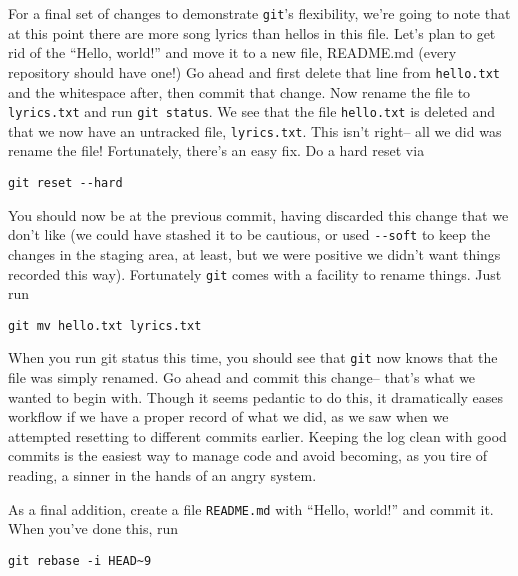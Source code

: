 {\par{
For a final set of changes to demonstrate \verb+git+'s flexibility, we're
going to note that at this point there are more song lyrics than hellos in
this file. Let's plan to get rid of the ``Hello, world!'' and move it to a new
file, README.md (every repository should have one!)
Go ahead and first delete that line from \verb+hello.txt+ and the whitespace
after, then commit that change. Now rename the file to \verb+lyrics.txt+ and
run \verb+git status+. We see that the file \verb+hello.txt+ is deleted and
that we now have an untracked file, \verb+lyrics.txt+. This isn't right-- all
we did was rename the file! Fortunately, there's an easy fix. Do a hard reset
via
}

\begin{verbatim}
git reset --hard
\end{verbatim}

\par{
You should now be at the previous commit, having discarded this change that we
don't like (we could have stashed it to be cautious, or used \verb+--soft+ to
keep the changes in the staging area, at least, but we were positive we didn't
want things recorded this way). Fortunately \verb+git+ comes with a facility
to rename things. Just run
}

\begin{verbatim}
git mv hello.txt lyrics.txt
\end{verbatim}

\par{
When you run git status this time, you should see that \verb+git+ now knows
that the file was simply renamed. Go ahead and commit this change-- that's
what we wanted to begin with. Though it seems pedantic to do this, it
dramatically eases workflow if we have a proper record of what we did, as we
saw when we attempted resetting to different commits earlier.
Keeping the log clean with good commits is the easiest way to manage code and
avoid becoming, as you tire of reading, a sinner in the hands of an angry
system.
}

\par{
As a final addition, create a file \verb+README.md+ with ``Hello, world!'' and
commit it. When you've done this, run 
}

\begin{verbatim}
git rebase -i HEAD~9
\end{verbatim}

}
